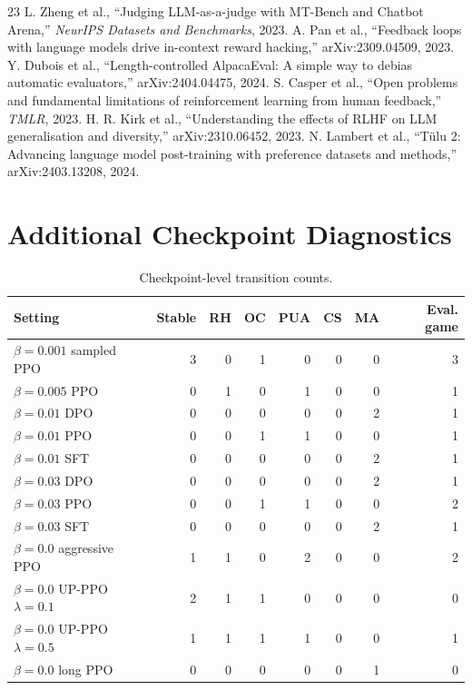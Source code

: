 \documentclass[11pt]{article}
\begin{document}
\begin{thebibliography}{23}
 L. Zheng et al., ``Judging LLM-as-a-judge with MT-Bench and Chatbot Arena,'' \emph{NeurIPS Datasets and Benchmarks}, 2023.
 A. Pan et al., ``Feedback loops with language models drive in-context reward hacking,'' arXiv:2309.04509, 2023.
 Y. Dubois et al., ``Length-controlled AlpacaEval: A simple way to debias automatic evaluators,'' arXiv:2404.04475, 2024.
 S. Casper et al., ``Open problems and fundamental limitations of reinforcement learning from human feedback,'' \emph{TMLR}, 2023.
 H. R. Kirk et al., ``Understanding the effects of RLHF on LLM generalisation and diversity,'' arXiv:2310.06452, 2023.
 N. Lambert et al., ``T\"ulu 2: Advancing language model post-training with preference datasets and methods,'' arXiv:2403.13208, 2024.
\end{thebibliography}

\appendix
\section{Additional Checkpoint Diagnostics}
\begin{table}[h]
\centering
\small
\caption{Checkpoint-level transition counts.}
\label{tab:appendix-checkpoint-counts}
\begin{tabular}{lrrrrrrr}
\toprule
Setting & Stable & RH & OC & PUA & CS & MA & Eval. game \\
\midrule
$\beta=0.001$ sampled PPO & 3 & 0 & 1 & 0 & 0 & 0 & 3 \\
$\beta=0.005$ PPO & 0 & 1 & 0 & 1 & 0 & 0 & 1 \\
$\beta=0.01$ DPO & 0 & 0 & 0 & 0 & 0 & 2 & 1 \\
$\beta=0.01$ PPO & 0 & 0 & 1 & 1 & 0 & 0 & 1 \\
$\beta=0.01$ SFT & 0 & 0 & 0 & 0 & 0 & 2 & 1 \\
$\beta=0.03$ DPO & 0 & 0 & 0 & 0 & 0 & 2 & 1 \\
$\beta=0.03$ PPO & 0 & 0 & 1 & 1 & 0 & 0 & 2 \\
$\beta=0.03$ SFT & 0 & 0 & 0 & 0 & 0 & 2 & 1 \\
$\beta=0.0$ aggressive PPO & 1 & 1 & 0 & 2 & 0 & 0 & 2 \\
$\beta=0.0$ UP-PPO $\lambda=0.1$ & 2 & 1 & 1 & 0 & 0 & 0 & 0 \\
$\beta=0.0$ UP-PPO $\lambda=0.5$ & 1 & 1 & 1 & 1 & 0 & 0 & 1 \\
$\beta=0.0$ long PPO & 0 & 0 & 0 & 0 & 0 & 1 & 0 \\
\bottomrule
\end{tabular}
\end{table}
\end{document}
